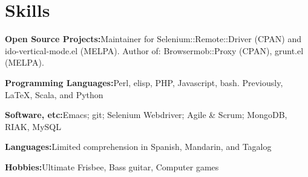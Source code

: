 \section{Skills}
%
\begin{position}
\item[] \textbf{Open Source Projects:}\quad Maintainer for Selenium::Remote::Driver (CPAN) and ido-vertical-mode.el (MELPA). Author of: Browsermob::Proxy (CPAN), grunt.el (MELPA).
\item[] \textbf{Programming Languages:}\quad Perl, elisp, PHP, Javascript, bash. Previously, \LaTeX, Scala, and Python%
\item[] \textbf{Software, etc:}\quad Emacs; git; Selenium Webdriver; Agile \& Scrum; MongoDB, RIAK, MySQL
\item[] \textbf{Languages:}\quad Limited comprehension in Spanish, Mandarin, and Tagalog
\item[] \textbf{Hobbies:}\quad Ultimate Frisbee, Bass guitar, Computer games
\end{position}
